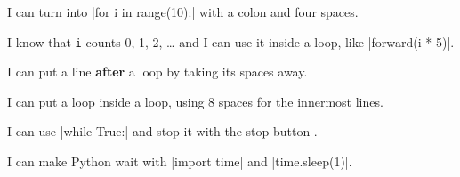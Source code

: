 \tick I can turn  into \py|for i in range(10):| with a colon and four spaces.\par
\tick I know that \texttt{i} counts 0, 1, 2, \ldots{} and I can use it inside a loop, like \py|forward(i * 5)|.\par
\tick I can put a line \textbf{after} a loop by taking its spaces away.\par
\tick I can put a loop inside a loop, using 8 spaces for the innermost lines.\par
\tick I can use \py|while True:| and stop it with the stop button \stopbtn.\par
\tick I can make Python wait with \py|import time| and \py|time.sleep(1)|.
